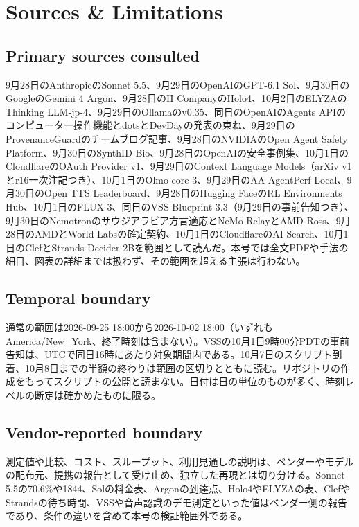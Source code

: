 \section*{Sources \& Limitations}

\subsection*{Primary sources consulted}
9月28日のAnthropicのSonnet 5.5、9月29日のOpenAIのGPT-6.1 Sol、9月30日のGoogleのGemini 4 Argon、9月28日のH CompanyのHolo4、10月2日のELYZAのThinking LLM-jp-4、9月29日のOllamaのv0.35、同日のOpenAIのAgents APIのコンピューター操作機能とdotsとDevDayの発表の束ね、9月29日のProvenanceGuardのチームブログ記事、9月28日のNVIDIAのOpen Agent Safety Platform、9月30日のSynthID Bio、9月28日のOpenAIの安全事例集、10月1日のCloudflareのOAuth Provider v1、9月29日のContext Language Models（arXiv v1とr16一次注記つき）、10月1日のOlmo-core 3、9月29日のAA-AgentPerf-Local、9月30日のOpen TTS Leaderboard、9月28日のHugging FaceのRL Environments Hub、10月1日のFLUX 3、同日のVSS Blueprint 3.3（9月29日の事前告知つき）、9月30日のNemotronのサウジアラビア方言適応とNeMo RelayとAMD Ross、9月28日のAMDとWorld Labsの確定契約、10月1日のCloudflareのAI Search、10月1日のClefとStrands Decider 2Bを範囲として読んだ。本号では全文PDFや手法の細目、図表の詳細までは扱わず、その範囲を超える主張は行わない。

\subsection*{Temporal boundary}
通常の範囲は2026-09-25 18:00から2026-10-02 18:00（いずれもAmerica/New\_York、終了時刻は含まない）。VSSの10月1日9時00分PDTの事前告知は、UTCで同日16時にあたり対象期間内である。10月7日のスクリプト到着、10月8日までの半額の終わりは範囲の区切りとともに読む。リポジトリの作成をもってスクリプトの公開と読まない。日付は日の単位のものが多く、時刻レベルの断定は確かめたものに限る。

\subsection*{Vendor-reported boundary}
測定値や比較、コスト、スループット、利用見通しの説明は、ベンダーやモデルの配布元、提携の報告として受け止め、独立した再現とは切り分ける。Sonnet 5.5の70.6\%や1844、Solの料金表、Argonの到達点、Holo4やELYZAの表、ClefやStrandsの待ち時間、VSSや音声認識のデモ測定といった値はベンダー側の報告であり、条件の違いを含めて本号の検証範囲外である。

